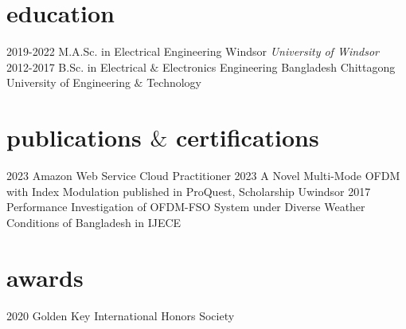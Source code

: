 \documentclass[]{twentysecondcv}
\begin{document}
\section{education}
\begin{twenty}
  \twentyitem
    {2019-2022}
    {M.A.Sc. {\normalfont in Electrical Engineering}}
    {Windsor}
    {\emph{University of Windsor}}
  \twentyitem
    {2012-2017}
    {B.Sc. in Electrical $\&$ Electronics Engineering}
    {Bangladesh}
    {Chittagong University of Engineering $\&$ Technology}
\end{twenty}

\section{publications $\&$ certifications}
\begin{twentyshort}
  \twentyitemshort
    {2023}
    {Amazon Web Service Cloud Practitioner}
  \twentyitemshort
    {2023}
    {A Novel Multi-Mode OFDM with Index Modulation published in ProQuest, Scholarship Uwindsor}
  \twentyitemshort
    {2017}
    {Performance Investigation of OFDM-FSO System under Diverse Weather Conditions of Bangladesh in IJECE}
\end{twentyshort}

\section{awards}
\begin{twentyshort}
  \twentyitemshort
    {2020}
    {Golden Key International Honors Society}
\end{twentyshort}



\end{document}
